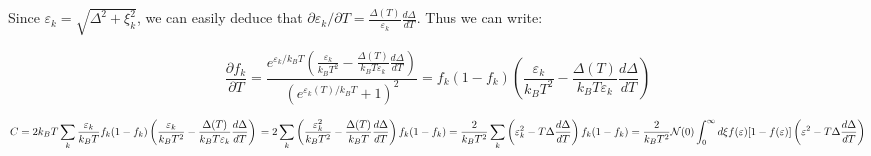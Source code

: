 Since \(\varepsilon_k = \sqrt{\Delta^2 + \xi_k^2}\), we can easily
deduce that
\(\partial \varepsilon_k / \partial T = \frac{\Delta(T)}{\varepsilon_k}\frac{d\Delta}{dT}\).
Thus we can write:

\[\frac{\partial f_k}{\partial T} = \frac{e^{\varepsilon_k/k_BT}\left(\frac{\varepsilon_k}{k_B T^2} - \frac{\Delta(T)}{k_B T \varepsilon_k}\frac{d\Delta}{dT}\right)}{(e^{\varepsilon_k(T)/k_B T}+1)^2} = f_k(1-f_k)\left(\frac{\varepsilon_k}{k_B T^2} - \frac{\Delta(T)}{k_B T \varepsilon_k}\frac{d\Delta}{dT}\right)\]

\[ C = 2 k_B T \sum_k \frac{\varepsilon_k}{k_B T} f_k(1-f_k)\left(\frac{\varepsilon_k}{k_B T^2} - \frac{\Delta(T)}{k_B T \varepsilon_k}\frac{d\Delta}{dT}\right) \\ = 2 \sum_k \left(\frac{\varepsilon_k^2}{k_B T^2} - \frac{\Delta(T)}{k_B T}\frac{d\Delta}{dT}\right)f_k(1-f_k) \\ = \frac{2}{k_B T^2}\sum_k \left(\varepsilon_k^2 - T \Delta \frac{d\Delta}{dT}\right)f_k(1-f_k) \\ = \frac{2}{k_B T^2} \mathcal{N}(0)\int_0^\infty d\xi f(\varepsilon) [1-f(\varepsilon)]\left(\varepsilon^2 - T \Delta \frac{d\Delta}{dT}\right)\]

